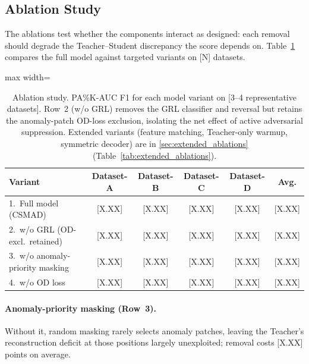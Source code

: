\subsection{Ablation Study}
\label{sec:ablation}

The ablations test whether the components interact as designed: each removal should degrade the
Teacher--Student discrepancy the score depends on.
Table~\ref{tab:ablation} compares the full model against targeted variants on [N] datasets.

\begin{table}[t]
\scriptsize
\centering
\setlength{\tabcolsep}{3pt}
\caption{Ablation study. PA\%K-AUC F1 for each model variant on [3--4 representative datasets].
  Row~2 (w/o GRL) removes the GRL classifier and reversal but retains the anomaly-patch
  OD-loss exclusion, isolating the net effect of active adversarial suppression.
  Extended variants (feature matching, Teacher-only warmup, symmetric decoder) are in
  \ref{sec:extended_ablations} (Table~\ref{tab:extended_ablations}).}
\label{tab:ablation}
\begin{adjustbox}{max width=\linewidth}
\begin{tabular}{lccccc}
\toprule
Variant & Dataset-A & Dataset-B & Dataset-C & Dataset-D & Avg. \\
\midrule
1.\ Full model (CSMAD)           & {[X.XX]} & {[X.XX]} & {[X.XX]} & {[X.XX]} & {[X.XX]} \\
2.\ w/o GRL (OD-excl.\ retained) & {[X.XX]} & {[X.XX]} & {[X.XX]} & {[X.XX]} & {[X.XX]} \\
3.\ w/o anomaly-priority masking  & {[X.XX]} & {[X.XX]} & {[X.XX]} & {[X.XX]} & {[X.XX]} \\
4.\ w/o OD loss                   & {[X.XX]} & {[X.XX]} & {[X.XX]} & {[X.XX]} & {[X.XX]} \\
\bottomrule
\end{tabular}
\end{adjustbox}
\end{table}

\paragraph{Anomaly-priority masking (Row~3).}
Without it, random masking rarely selects anomaly patches, leaving the Teacher's reconstruction
deficit at those positions largely unexploited; removal costs [X.XX] points on average.

